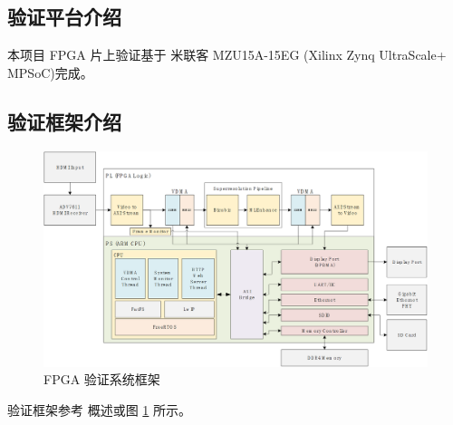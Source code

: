 \documentclass[12pt, a4paper, oneside]{ctexbook}
\begin{document}
	\subsection{验证平台介绍}
	本项目 FPGA 片上验证基于 米联客 MZU15A-15EG (Xilinx Zynq UltraScale+ MPSoC)完成。
	\subsection{验证框架介绍}
	\begin{figure}
		\centering
		\includegraphics[scale=0.5]{pic/Architecture.png}
		\caption{FPGA 验证系统框架}
		\label{architecture}
	\end{figure}
	验证框架参考 \textbf{} 概述或图 \ref{architecture} 所示。
\end{document}
